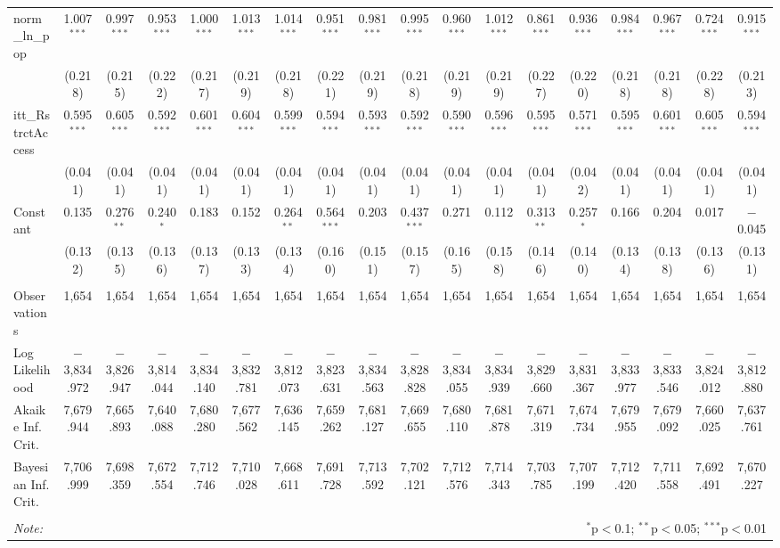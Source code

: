 \begin{sidewaystable}[!htbp]
\begin{tabular}{@{\extracolsep{5pt}}lccccccccccccccccc}
  norm\_ln\_pop & 1.007$^{***}$ & 0.997$^{***}$ & 0.953$^{***}$ & 1.000$^{***}$ & 1.013$^{***}$ & 1.014$^{***}$ & 0.951$^{***}$ & 0.981$^{***}$ & 0.995$^{***}$ & 0.960$^{***}$ & 1.012$^{***}$ & 0.861$^{***}$ & 0.936$^{***}$ & 0.984$^{***}$ & 0.967$^{***}$ & 0.724$^{***}$ & 0.915$^{***}$ \\ 
  & (0.218) & (0.215) & (0.222) & (0.217) & (0.219) & (0.218) & (0.221) & (0.219) & (0.218) & (0.219) & (0.219) & (0.227) & (0.220) & (0.218) & (0.218) & (0.228) & (0.213) \\ 
  itt\_RstrctAccess & 0.595$^{***}$ & 0.605$^{***}$ & 0.592$^{***}$ & 0.601$^{***}$ & 0.604$^{***}$ & 0.599$^{***}$ & 0.594$^{***}$ & 0.593$^{***}$ & 0.592$^{***}$ & 0.590$^{***}$ & 0.596$^{***}$ & 0.595$^{***}$ & 0.571$^{***}$ & 0.595$^{***}$ & 0.601$^{***}$ & 0.605$^{***}$ & 0.594$^{***}$ \\ 
  & (0.041) & (0.041) & (0.041) & (0.041) & (0.041) & (0.041) & (0.041) & (0.041) & (0.041) & (0.041) & (0.041) & (0.041) & (0.042) & (0.041) & (0.041) & (0.041) & (0.041) \\ 
  Constant & 0.135 & 0.276$^{**}$ & 0.240$^{*}$ & 0.183 & 0.152 & 0.264$^{**}$ & 0.564$^{***}$ & 0.203 & 0.437$^{***}$ & 0.271 & 0.112 & 0.313$^{**}$ & 0.257$^{*}$ & 0.166 & 0.204 & 0.017 & $-$0.045 \\ 
  & (0.132) & (0.135) & (0.136) & (0.137) & (0.133) & (0.134) & (0.160) & (0.151) & (0.157) & (0.165) & (0.158) & (0.146) & (0.140) & (0.134) & (0.138) & (0.136) & (0.131) \\ 
 \hline \\[-1.8ex] 
Observations & 1,654 & 1,654 & 1,654 & 1,654 & 1,654 & 1,654 & 1,654 & 1,654 & 1,654 & 1,654 & 1,654 & 1,654 & 1,654 & 1,654 & 1,654 & 1,654 & 1,654 \\ 
Log Likelihood & $-$3,834.972 & $-$3,826.947 & $-$3,814.044 & $-$3,834.140 & $-$3,832.781 & $-$3,812.073 & $-$3,823.631 & $-$3,834.563 & $-$3,828.828 & $-$3,834.055 & $-$3,834.939 & $-$3,829.660 & $-$3,831.367 & $-$3,833.977 & $-$3,833.546 & $-$3,824.012 & $-$3,812.880 \\ 
Akaike Inf. Crit. & 7,679.944 & 7,665.893 & 7,640.088 & 7,680.280 & 7,677.562 & 7,636.145 & 7,659.262 & 7,681.127 & 7,669.655 & 7,680.110 & 7,681.878 & 7,671.319 & 7,674.734 & 7,679.955 & 7,679.092 & 7,660.025 & 7,637.761 \\ 
Bayesian Inf. Crit. & 7,706.999 & 7,698.359 & 7,672.554 & 7,712.746 & 7,710.028 & 7,668.611 & 7,691.728 & 7,713.592 & 7,702.121 & 7,712.576 & 7,714.343 & 7,703.785 & 7,707.199 & 7,712.420 & 7,711.558 & 7,692.491 & 7,670.227 \\ 
\hline 
\hline \\[-1.8ex] 
\textit{Note:}  & \multicolumn{17}{r}{$^{*}$p$<$0.1; $^{**}$p$<$0.05; $^{***}$p$<$0.01} \\ 
\end{tabular} 
\end{sidewaystable} 
